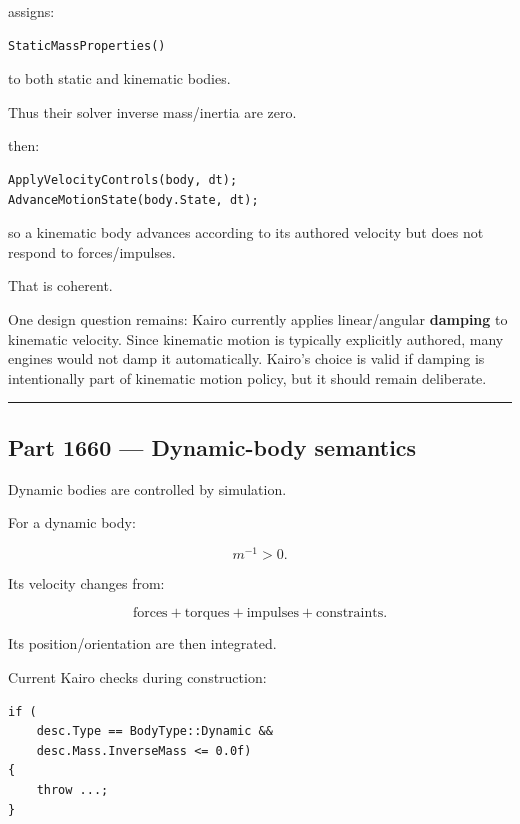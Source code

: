 \hypertarget{06-engine-ii-ch037-current-kairo-semantics}{}

 assigns:

\begin{verbatim}
StaticMassProperties()
\end{verbatim}

to both static and kinematic bodies.

Thus their solver inverse mass/inertia are zero.

 then:

\begin{verbatim}
ApplyVelocityControls(body, dt);
AdvanceMotionState(body.State, dt);
\end{verbatim}

so a kinematic body advances according to its authored velocity but does not respond to forces/impulses.

That is coherent.

One design question remains: Kairo currently applies linear/angular \textbf{damping} to kinematic velocity. Since kinematic motion is typically explicitly authored, many engines would not damp it automatically. Kairo's choice is valid if damping is intentionally part of kinematic motion policy, but it should remain deliberate.

\begin{center}\rule{0.5\linewidth}{0.5pt}\end{center}

\subsection{Part 1660 --- Dynamic-body semantics}\label{06-engine-ii-ch037-part-1660-dynamic-body-semantics}

\hypertarget{06-engine-ii-ch037-part-1660-dynamic-body-semantics}{}

Dynamic bodies are controlled by simulation.

For a dynamic body:

\[
m^{-1}>0.
\]

Its velocity changes from:

\[
\text{forces}
+
\text{torques}
+
\text{impulses}
+
\text{constraints}.
\]

Its position/orientation are then integrated.

Current Kairo checks during construction:

\begin{verbatim}
if (
    desc.Type == BodyType::Dynamic &&
    desc.Mass.InverseMass <= 0.0f)
{
    throw ...;
}
\end{verbatim}


